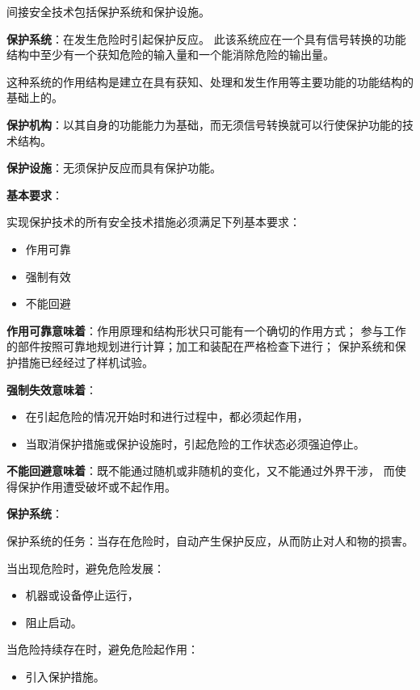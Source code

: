 \documentclass[letterpaper,10pt,english]{sphinxmanual}
\begin{document}
间接安全技术包括保护系统和保护设施。

\textbf{保护系统}：在发生危险时引起保护反应。
此该系统应在一个具有信号转换的功能结构中至少有一个获知危险的输入量和一个能消除危险的输出量。

这种系统的作用结构是建立在具有获知、处理和发生作用等主要功能的功能结构的基础上的。

\textbf{保护机构}：以其自身的功能能力为基础，而无须信号转换就可以行使保护功能的技术结构。

\textbf{保护设施}：无须保护反应而具有保护功能。

\textbf{基本要求}：

实现保护技术的所有安全技术措施必须满足下列基本要求：
\begin{itemize}
\item {} 
作用可靠

\item {} 
强制有效

\item {} 
不能回避

\end{itemize}

\textbf{作用可靠意味着}：作用原理和结构形状只可能有一个确切的作用方式；
参与工作的部件按照可靠地规划进行计算；加工和装配在严格检查下进行；
保护系统和保护措施已经经过了样机试验。

\textbf{强制失效意味着}：
\begin{itemize}
\item {} 
在引起危险的情况开始时和进行过程中，都必须起作用，

\item {} 
当取消保护措施或保护设施时，引起危险的工作状态必须强迫停止。

\end{itemize}

\textbf{不能回避意味着}：既不能通过随机或非随机的变化，又不能通过外界干涉，
而使得保护作用遭受破坏或不起作用。

\textbf{保护系统}：

保护系统的任务：当存在危险时，自动产生保护反应，从而防止对人和物的损害。

当出现危险时，避免危险发展：
\begin{itemize}
\item {} 
机器或设备停止运行，

\item {} 
阻止启动。

\end{itemize}

当危险持续存在时，避免危险起作用：
\begin{itemize}
\item {} 
引入保护措施。

\end{itemize}
\end{document}
